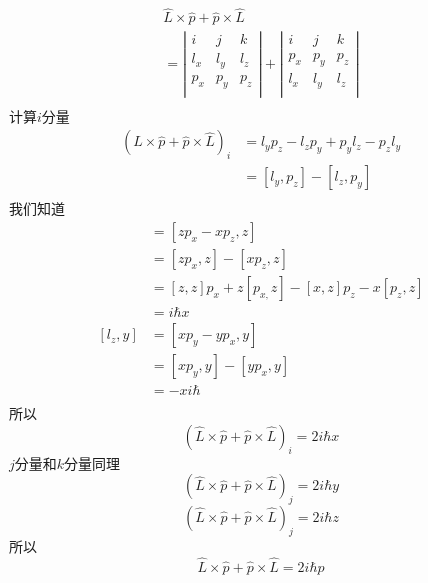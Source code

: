 $$
\begin{array}{l}
	\hat{L}\times \hat{p}+\hat{p}\times \hat{L}\\
	=\left| \begin{matrix}
	i&		j&		k\\
	l_x&		l_y&		l_z\\
	p_x&		p_y&		p_z\\
\end{matrix} \right|+\left| \begin{matrix}
	i&		j&		k\\
	p_x&		p_y&		p_z\\
	l_x&		l_y&		l_z\\
\end{matrix} \right|\\
\end{array}
$$
计算$i$分量
\begin{align}
\left(\hat{L}\times \hat{p}+\hat{p}\times \hat{L}\right)_i&= l_yp_z-l_zp_y+p_yl_z-p_zl_y \\
&=\left[ l_y,p_z \right] -\left[ l_z,p_y \right]\\
\end{align}
我们知道
\begin{align}
	[l_y,z]&=\left[ zp_x-xp_z,z \right]\\
	&=\left[ zp_x,z \right] -\left[ xp_z,z \right]\\
	&=[z,z]p_x+z\left[ p_{x,}z \right] -[x,z]p_z-x\left[ p_z,z \right]\\
	&=i\hbar x\\
	[l_z,y]&=\left[ xp_y-yp_x,y \right]\\
	&=\left[ xp_y,y \right] -[yp_x,y]\\
	&=-xi\hbar\\
\end{align}
所以
$$
\left(\hat{L}\times \hat{p}+\hat{p}\times \hat{L}\right)_i=2i\hbar x
$$
$j$分量和$k$分量同理
$$
\left(\hat{L}\times \hat{p}+\hat{p}\times \hat{L}\right)_j=2i\hbar y
$$$$
\left(\hat{L}\times \hat{p}+\hat{p}\times \hat{L}\right)_j=2i\hbar z
$$
所以
$$
\hat{L}\times \hat{p}+\hat{p}\times \hat{L}=2i\hbar \hat{p}
$$
